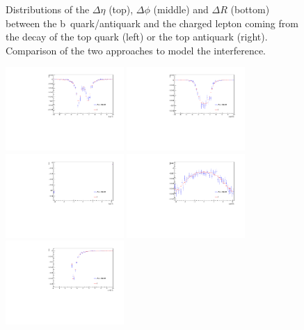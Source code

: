 \begin{figure}
  \caption{Distributions of the $\Delta\eta$ (top), $\Delta\phi$ (middle) and $\Delta R$ (bottom) between the b~quark/antiquark and the charged lepton coming from the decay of the top quark (left) or the top antiquark (right). Comparison of the two approaches to model the interference.}
  \label{fig:comparison_b_relto_l}
\end{figure}

\begin{figure} \centering
  \includegraphics[width=0.4\textwidth]{fig/chapt4/gen_plots/ttbar_deltaEta_compare.pdf}
  \includegraphics[width=0.4\textwidth]{fig/chapt4/gen_plots/bbbar_deltaEta_compare.pdf}\\
  \includegraphics[width=0.4\textwidth]{fig/chapt4/gen_plots/ttbar_deltaphi_compare.pdf}
  \includegraphics[width=0.4\textwidth]{fig/chapt4/gen_plots/bbbar_deltaphi_compare.pdf}\\
  \includegraphics[width=0.4\textwidth]{fig/chapt4/gen_plots/ttbar_deltaR_compare.pdf}

\end{figure}
